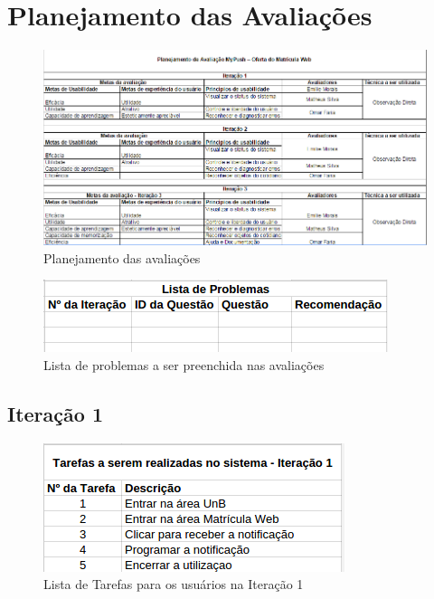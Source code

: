\chapter{Planejamento das Avaliações}

\begin{figure}[h!]
    \includegraphics[keepaspectratio=true, scale=0.65]{figuras/planejamentoavaliacoes.png}
  \caption{Planejamento das avaliações}
\end{figure}

\begin{figure}[h!]
  \centering
    \includegraphics[keepaspectratio=true, scale=0.7]{figuras/listaproblemas.png}
  \caption{Lista de problemas a ser preenchida nas avaliações}
\end{figure}

\pagebreak

\section{Iteração 1}

\begin{figure}[h!]
  \centering
    \includegraphics[keepaspectratio=true, scale=0.7]{figuras/tarefas1.png}
  \caption{Lista de Tarefas para os usuários na Iteração 1}
\end{figure}